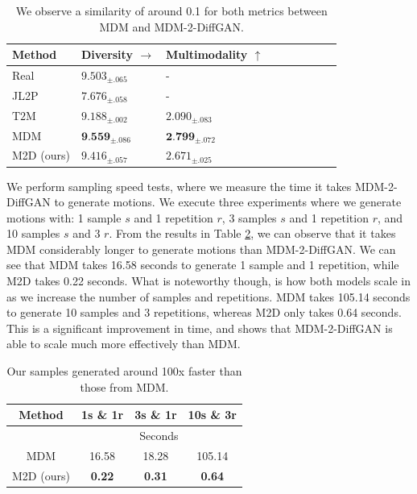 \documentclass[10pt,twocolumn,letterpaper]{article}
\begin{document}
\begin{table}[H]
    \begin{tabular}{|p{2cm}|p{2cm}|p{2cm}|c|c|c|c|c|c|}
        \hline Method & Diversity $\rightarrow$ & Multimodality $\uparrow$ \\
        \hline Real & $9.503_{ \pm .065}$ & - \\
        \hline JL2P & $7.676_{ \pm .058}$ & - \\
        \hline $\mathrm{T} 2 \mathrm{M}$ & $9.188_{ \pm .002}$ & $2.090_{ \pm .083}$ \\
        \hline MDM & $\textbf{9.559}_{ \pm .086}$ & $\textbf{2.799}_{ \pm .072}$ \\
        \hline M2D (ours) & $9.416_{ \pm .057}$ & $2.671_{ \pm .025}$ \\
        \hline
        \end{tabular}
    \caption{We observe a similarity of around 0.1 for both metrics between MDM and MDM-2-DiffGAN.}
    \label{tab:metrics2}
\end{table}


We perform sampling speed tests, where we measure the time it takes MDM-2-DiffGAN to generate motions. We execute 
three experiments where we generate motions with: 1 sample $s$ and 1 repetition $r$, 3 samples $s$ and 1 repetition $r$, and 10 samples 
$s$ and 3 $r$. From the results in Table \ref{tab:time}, we can observe that it takes MDM considerably longer to generate motions 
than MDM-2-DiffGAN. We can see that MDM takes 16.58 seconds to generate 1 sample and 1 repetition, while M2D takes 0.22 seconds. 
What is noteworthy though, is how both models scale in as we increase the number of samples and repetitions. MDM takes 105.14 seconds 
to generate 10 samples and 3 repetitions, whereas M2D only takes 0.64 seconds. This is a significant improvement in time, and shows that 
MDM-2-DiffGAN is able to scale much more effectively than MDM.
\begin{table}[H]
    \centering
    \begin{tabular}{|c|ccc|}
    \hline
    Method & \multicolumn{1}{c|}{1s \& 1r} & \multicolumn{1}{c|}{3s \& 1r} & 10s \& 3r \\ \hline
           & \multicolumn{3}{c|}{Seconds}                                              \\ \hline
    MDM    & \multicolumn{1}{c|}{16.58}    & \multicolumn{1}{c|}{18.28}    & 105.14    \\ \hline
    M2D (ours)    & \multicolumn{1}{c|}{\textbf{0.22}}     & \multicolumn{1}{c|}{\textbf{0.31}}     & \textbf{0.64}      \\ \hline
    \end{tabular}
    \caption{Our samples generated around 100x faster than those from MDM.}
    \label{tab:time}
\end{table}
\end{document}
